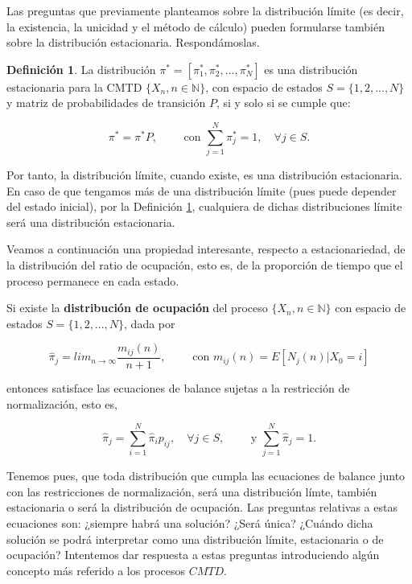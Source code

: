 \documentclass[
]{book}
\newenvironment{yellowbox}{
  \definecolor{shadecolor}{rgb}{210, 180, 140}  
  \color{black}
  \begin{shaded}}
 {\end{shaded}}
\theoremstyle{definition}
\newtheorem{definition}{Definición}[chapter]
\theoremstyle{definition}
\theoremstyle{definition}
\theoremstyle{definition}
\theoremstyle{remark}
\begin{document}
Las preguntas que previamente planteamos sobre la distribución límite (es decir, la existencia, la unicidad y el método de cálculo) pueden formularse también sobre la distribución estacionaria. Respondámoslas.

\begin{yellowbox}

\begin{definition}
\protect\hypertarget{def:steadystatedist2}{}\label{def:steadystatedist2}La distribución \(\pi^* = [\pi_1^*, \pi_2^*,...,\pi_N^*]\) es una distribución estacionaria para la CMTD \(\{X_n, n \in \mathbb{N}\}\), con espacio de estados \(S =\{1, 2,..., N\}\) y matriz de probabilidades de transición \(P\), si y solo si se cumple que:

\[\pi^* = \pi^* P, \qquad \text{ con } \sum_{j=1}^N \pi_j^* = 1, \quad \forall j \in S.\]
\end{definition}

\end{yellowbox}

Por tanto, la distribución límite, cuando existe, es una distribución estacionaria. En caso de que tengamos más de una distribución límite (pues puede depender del estado inicial), por la Definición \ref{def:steadystatedist2}, cualquiera de dichas distribuciones límite será una distribución estacionaria.

Veamos a continuación una propiedad interesante, respecto a estacionariedad, de la distribución del ratio de ocupación, esto es, de la proporción de tiempo que el proceso permanece en cada estado.

\begin{yellowbox}

Si existe la \textbf{distribución de ocupación} del proceso \(\{X_n, n \in \mathbb{N}\}\) con espacio de estados \(S =\{1, 2,..., N\}\), dada por

\[\hat{\pi}_j=lim_{n \rightarrow \infty} \frac{m_{ij}(n)}{n+1}, \qquad \text{ con } m_{ij}(n)=E[N_j(n)|X_0=i]\]

entonces satisface las ecuaciones de balance sujetas a la restricción de normalización, esto es,

\[\hat{\pi}_j = \sum_{i=1}^N \hat{\pi}_i p_{ij}, \quad \forall j \in S, \qquad \text{ y } \sum_{j=1}^N \hat{\pi}_j=1.\]

\end{yellowbox}

Tenemos pues, que toda distribución que cumpla las ecuaciones de balance junto con las restricciones de normalización, será una distribución límte, también estacionaria o será la distribución de ocupación. Las preguntas relativas a estas ecuaciones son: ¿siempre habrá una solución? ¿Será única? ¿Cuándo dicha solución se podrá interpretar como una distribución límite, estacionaria o de ocupación? Intentemos dar respuesta a estas preguntas introduciendo algún concepto más referido a los procesos \(CMTD\).
\end{document}
